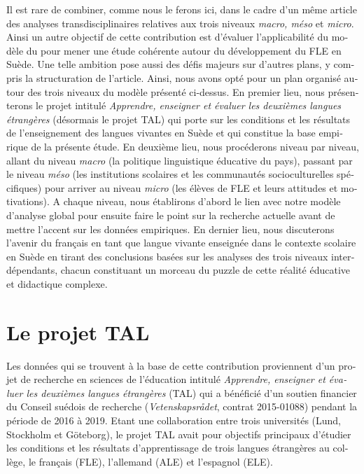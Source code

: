 \documentclass[french, output=paper]{langscibook}
\begin{document}
\begin{otherlanguage}{french}
Il est rare de combiner, comme nous le ferons ici, dans le cadre d’un même article des analyses transdisciplinaires relatives aux trois niveaux \textit{macro, méso} et \textit{micro}. Ainsi un autre objectif de cette contribution est d’évaluer l’applicabilité du modèle du \citet{TheDouglasFirgroup2016} pour mener une étude cohérente autour du développement du FLE en Suède.  Une telle ambition pose aussi des défis majeurs sur d’autres plans, y compris la structuration de l’article. Ainsi, nous avons opté pour un plan organisé autour des trois niveaux du modèle présenté ci-dessus. En premier lieu, nous présenterons le projet intitulé \textit{Apprendre, enseigner et évaluer les deuxièmes langues étrangères} (désormais le projet TAL) qui porte sur les conditions et les résultats de l’enseignement des langues vivantes en Suède et qui constitue la base empirique de la présente étude. En deuxième lieu, nous procéderons niveau par niveau, allant du niveau \textit{macro} (la politique linguistique éducative du pays), passant par le niveau \textit{méso} (les institutions scolaires et les communautés socioculturelles spécifiques) pour arriver au niveau \textit{micro} (les élèves de FLE et leurs attitudes et motivations). A chaque niveau, nous établirons d’abord le lien avec notre modèle d’analyse global pour ensuite faire le point sur la recherche actuelle avant de mettre l’accent sur les données empiriques. En dernier lieu, nous discuterons l’avenir du français en tant que langue vivante enseignée dans le contexte scolaire en Suède en tirant des conclusions basées sur les analyses des trois niveaux interdépendants, chacun constituant un morceau du puzzle de cette réalité éducative et didactique complexe.

\section{Le projet TAL}\label{sec:granfeldt:2}

Les données qui se trouvent à la base de cette contribution proviennent d’un projet de recherche en sciences de l’éducation intitulé \textit{Apprendre, enseigner et évaluer les deuxièmes langues étrangères} (TAL) qui a bénéficié d’un soutien financier du Conseil suédois de recherche (\textit{Vetenskapsrådet}, contrat 2015-01088) pendant la période de 2016 à 2019. Etant une collaboration entre trois universités (Lund, Stockholm et Göteborg), le projet TAL avait pour objectifs principaux d’étudier les conditions et les résultats d’apprentissage de trois langues étrangères au collège, le français (FLE), l’allemand (ALE) et l’espagnol (ELE). 


\end{otherlanguage}
\end{document}
